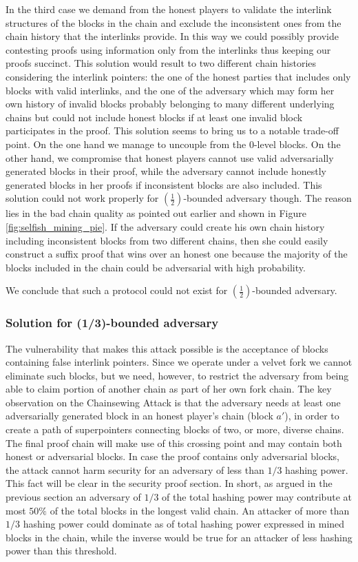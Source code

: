 In the third case we demand from the honest players to validate the interlink structures of the blocks in the chain and exclude the inconsistent ones from the chain history that the interlinks provide. In this way we could possibly provide contesting proofs using information only from the interlinks thus keeping our proofs succinct. This solution would result to two different chain histories considering the interlink pointers: the one of the honest parties that includes only blocks with valid interlinks, and the one of the adversary which may form her own history of invalid blocks probably belonging to many different underlying chains but could not include honest blocks if at least one invalid block participates in the proof. This solution seems to bring us to a notable trade-off point. On the one hand we manage to uncouple from the 0-level blocks. On the other hand, we compromise that honest players cannot use valid adversarially generated blocks in their proof, while the adversary cannot include honestly generated blocks in her proofs if inconsistent blocks are also included. This solution could not work properly for $(\frac{1}{2})$-bounded adversary though. The reason lies in the bad chain quality as pointed out earlier and shown in Figure \ref{fig:selfish_mining_pie}. If the adversary  could create his own chain history including inconsistent blocks from two different chains, then she could easily construct a suffix proof that wins over an honest one because the majority of the blocks included in the chain could be adversarial with high probability. 

We conclude that such a protocol could not exist for $(\frac{1}{2})$-bounded adversary.


\subsubsection*{Solution for (1/3)-bounded adversary}
The vulnerability that makes this attack possible is the acceptance of blocks containing false interlink pointers. Since we operate under a velvet fork we cannot eliminate such blocks, but we need, however, to restrict the adversary from being able to claim portion of another chain as part of her own fork chain. 
The key observation on the Chainsewing Attack is that the adversary needs at least one adversarially generated block in an honest player's chain (block $a'$), in order to create a path of superpointers connecting blocks of two, or more, diverse chains. The final proof chain will make use of this crossing point and may contain both honest or adversarial blocks. 
In case the proof contains only adversarial blocks, the attack cannot harm security for an adversary of less than $1/3$ hashing power. This fact will be clear in the security proof section. In short, as argued in the previous section an adversary of $1/3$ of the total hashing power may contribute at most $ 50\% $ of the total blocks in the longest valid chain. An attacker of more than $1/3$ hashing power could dominate as of total hashing power expressed in mined blocks in the chain, while the inverse would be true for an attacker of less hashing power than this threshold.

